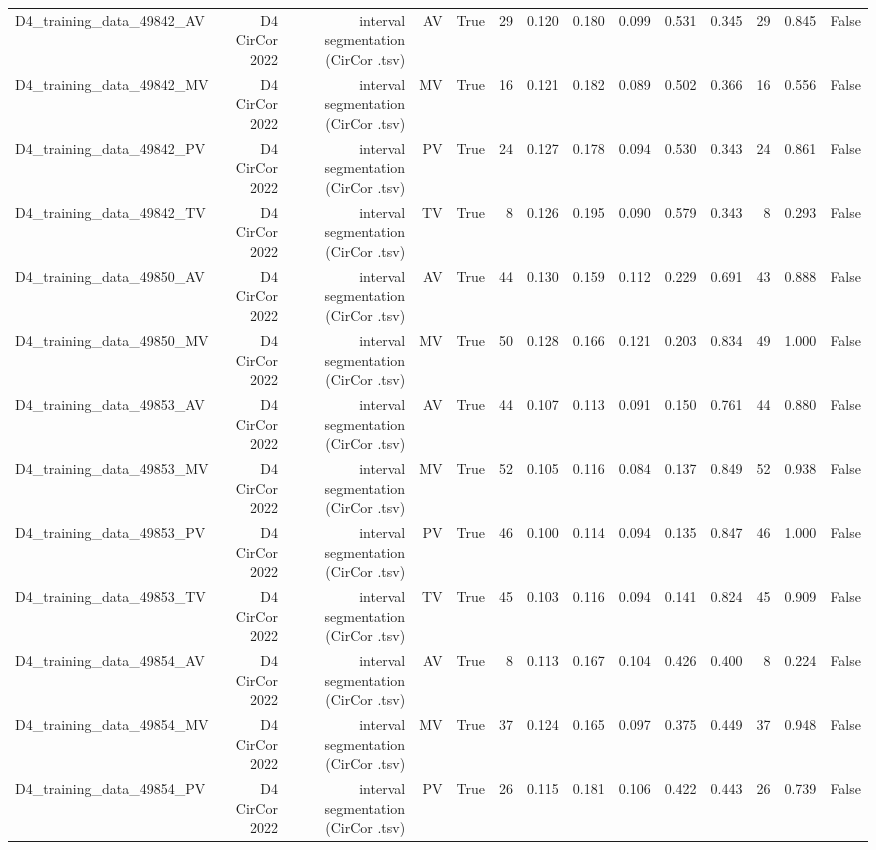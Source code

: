 \begin{table}[htbp]
\begin{tabular}{lrrrrrrrrrrrrr}
    D4\_training\_data\_49842\_AV & D4 CirCor 2022 & interval segmentation (CirCor .tsv) & AV & True & 29 & 0.120 & 0.180 & 0.099 & 0.531 & 0.345 & 29 & 0.845 & False \\
    D4\_training\_data\_49842\_MV & D4 CirCor 2022 & interval segmentation (CirCor .tsv) & MV & True & 16 & 0.121 & 0.182 & 0.089 & 0.502 & 0.366 & 16 & 0.556 & False \\
    D4\_training\_data\_49842\_PV & D4 CirCor 2022 & interval segmentation (CirCor .tsv) & PV & True & 24 & 0.127 & 0.178 & 0.094 & 0.530 & 0.343 & 24 & 0.861 & False \\
    D4\_training\_data\_49842\_TV & D4 CirCor 2022 & interval segmentation (CirCor .tsv) & TV & True & 8 & 0.126 & 0.195 & 0.090 & 0.579 & 0.343 & 8 & 0.293 & False \\
    D4\_training\_data\_49850\_AV & D4 CirCor 2022 & interval segmentation (CirCor .tsv) & AV & True & 44 & 0.130 & 0.159 & 0.112 & 0.229 & 0.691 & 43 & 0.888 & False \\
    D4\_training\_data\_49850\_MV & D4 CirCor 2022 & interval segmentation (CirCor .tsv) & MV & True & 50 & 0.128 & 0.166 & 0.121 & 0.203 & 0.834 & 49 & 1.000 & False \\
    D4\_training\_data\_49853\_AV & D4 CirCor 2022 & interval segmentation (CirCor .tsv) & AV & True & 44 & 0.107 & 0.113 & 0.091 & 0.150 & 0.761 & 44 & 0.880 & False \\
    D4\_training\_data\_49853\_MV & D4 CirCor 2022 & interval segmentation (CirCor .tsv) & MV & True & 52 & 0.105 & 0.116 & 0.084 & 0.137 & 0.849 & 52 & 0.938 & False \\
    D4\_training\_data\_49853\_PV & D4 CirCor 2022 & interval segmentation (CirCor .tsv) & PV & True & 46 & 0.100 & 0.114 & 0.094 & 0.135 & 0.847 & 46 & 1.000 & False \\
    D4\_training\_data\_49853\_TV & D4 CirCor 2022 & interval segmentation (CirCor .tsv) & TV & True & 45 & 0.103 & 0.116 & 0.094 & 0.141 & 0.824 & 45 & 0.909 & False \\
    D4\_training\_data\_49854\_AV & D4 CirCor 2022 & interval segmentation (CirCor .tsv) & AV & True & 8 & 0.113 & 0.167 & 0.104 & 0.426 & 0.400 & 8 & 0.224 & False \\
    D4\_training\_data\_49854\_MV & D4 CirCor 2022 & interval segmentation (CirCor .tsv) & MV & True & 37 & 0.124 & 0.165 & 0.097 & 0.375 & 0.449 & 37 & 0.948 & False \\
    D4\_training\_data\_49854\_PV & D4 CirCor 2022 & interval segmentation (CirCor .tsv) & PV & True & 26 & 0.115 & 0.181 & 0.106 & 0.422 & 0.443 & 26 & 0.739 & False \\

\end{tabular}
\end{table}
